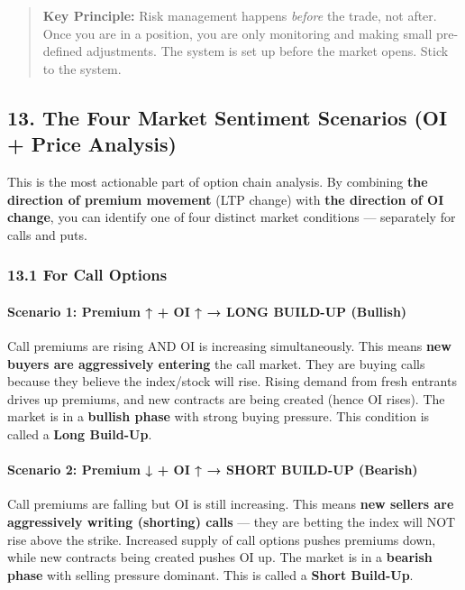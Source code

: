 \documentclass[12pt,openany]{book}
\begin{document}
\begin{quote}
\textbf{Key Principle:} Risk management happens \emph{before} the trade, not after. Once you are in a position, you are only monitoring and making small pre-defined adjustments. The system is set up before the market opens. Stick to the system.
\end{quote}


\subsection{13. The Four Market Sentiment Scenarios (OI + Price Analysis)}

This is the most actionable part of option chain analysis. By combining \textbf{the direction of premium movement} (LTP change) with \textbf{the direction of OI change}, you can identify one of four distinct market conditions — separately for calls and puts.

\subsubsection{13.1 For Call Options}

\paragraph{Scenario 1: Premium ↑ + OI ↑ → LONG BUILD-UP (Bullish)}

Call premiums are rising AND OI is increasing simultaneously. This means \textbf{new buyers are aggressively entering} the call market. They are buying calls because they believe the index/stock will rise. Rising demand from fresh entrants drives up premiums, and new contracts are being created (hence OI rises). The market is in a \textbf{bullish phase} with strong buying pressure. This condition is called a \textbf{Long Build-Up}.

\paragraph{Scenario 2: Premium ↓ + OI ↑ → SHORT BUILD-UP (Bearish)}

Call premiums are falling but OI is still increasing. This means \textbf{new sellers are aggressively writing (shorting) calls} — they are betting the index will NOT rise above the strike. Increased supply of call options pushes premiums down, while new contracts being created pushes OI up. The market is in a \textbf{bearish phase} with selling pressure dominant. This is called a \textbf{Short Build-Up}.
\end{document}
